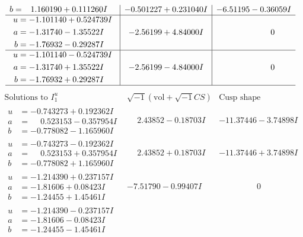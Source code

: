 \documentclass[1p]{elsarticle_modified}
\theoremstyle{definition}
\newcommand{\I}{\sqrt{-1}}
\begin{document}
$$\begin{array}{c|c|c}
\begin{aligned}
b &= \phantom{-}1.160190 + 0.111260 I\end{aligned}
 & -0.501227 + 0.231040 I & -6.51195 - 0.36059 I \\ \hline\begin{aligned}
u &= -1.101140 + 0.524739 I \\
a &= -1.31740 - 1.35522 I \\
b &= -1.76932 - 0.29287 I\end{aligned}
 & -2.56199 + 4.84000 I & \phantom{-0.000000 } 0 \\ \hline\begin{aligned}
u &= -1.101140 - 0.524739 I \\
a &= -1.31740 + 1.35522 I \\
b &= -1.76932 + 0.29287 I\end{aligned}
 & -2.56199 - 4.84000 I & \phantom{-0.000000 } 0\\
 \hline 
 \end{array}$$\newpage$$\begin{array}{c|c|c}  
\text{Solutions to }I^u_{1}& \I (\text{vol} + \sqrt{-1}CS) & \text{Cusp shape}\\
 \hline 
\begin{aligned}
u &= -0.743273 + 0.192362 I \\
a &= \phantom{-}0.523153 - 0.357954 I \\
b &= -0.778082 - 1.165960 I\end{aligned}
 & \phantom{-}2.43852 - 0.18703 I & -11.37446 - 3.74898 I \\ \hline\begin{aligned}
u &= -0.743273 - 0.192362 I \\
a &= \phantom{-}0.523153 + 0.357954 I \\
b &= -0.778082 + 1.165960 I\end{aligned}
 & \phantom{-}2.43852 + 0.18703 I & -11.37446 + 3.74898 I \\ \hline\begin{aligned}
u &= -1.214390 + 0.237157 I \\
a &= -1.81606 + 0.08423 I \\
b &= -1.24455 + 1.45461 I\end{aligned}
 & -7.51790 - 0.99407 I & \phantom{-0.000000 } 0 \\ \hline\begin{aligned}
u &= -1.214390 - 0.237157 I \\
a &= -1.81606 - 0.08423 I \\
b &= -1.24455 - 1.45461 I\end{aligned}

\end{array}$$
\end{document}
